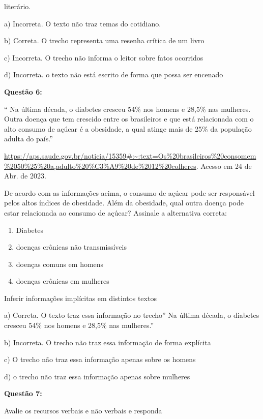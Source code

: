 literário.

a) Incorreta. O texto não traz temas do cotidiano.

b) Correta. O trecho representa uma resenha crítica de um livro

c) Incorreta. O trecho não informa o leitor sobre fatos ocorridos

d) Incorreta. o texto não está escrito de forma que possa ser encenado

\textbf{Questão 6:}

`` Na última década, o diabetes cresceu 54\% nos homens e 28,5\% nas
mulheres. Outra doença que tem crescido entre os brasileiros e que está
relacionada com o alto consumo de açúcar é a obesidade, a qual atinge
mais de 25\% da população adulta do país.''

\href{https://aps.saude.gov.br/noticia/15359\#:~:text=Os\%20brasileiros\%20consomem\%2050\%25\%20a,adulto\%20\%C3\%A9\%20de\%2012\%20colheres}{{https://aps.saude.gov.br/noticia/15359\#:\textasciitilde:text=Os\%20brasileiros\%20consomem\%2050\%25\%20a,adulto\%20\%C3\%A9\%20de\%2012\%20colheres}}.
Acesso em 24 de Abr. de 2023.

De acordo com as informações acima, o consumo de açúcar pode ser
responsável pelos altos índices de obesidade. Além da obesidade, qual
outra doença pode estar relacionada ao consumo de açúcar? Assinale a
alternativa correta:

\begin{enumerate}
\def\labelenumi{\alph{enumi})}
\item
  Diabetes
\item
  doenças crônicas não transmissíveis
\item
  doenças comuns em homens
\item
  doenças crônicas em mulheres
\end{enumerate}

Inferir informações implícitas em distintos textos

a) Correta. O texto traz essa informação no trecho'' Na última década, o
diabetes cresceu 54\% nos homens e 28,5\% nas mulheres.''

b) Incorreta. O trecho não traz essa informação de forma explícita

c) O trecho não traz essa informação apenas sobre os homens

d) o trecho não traz essa informação apenas sobre mulheres

\textbf{Questão 7:}

Avalie os recursos verbais e não verbais e responda

